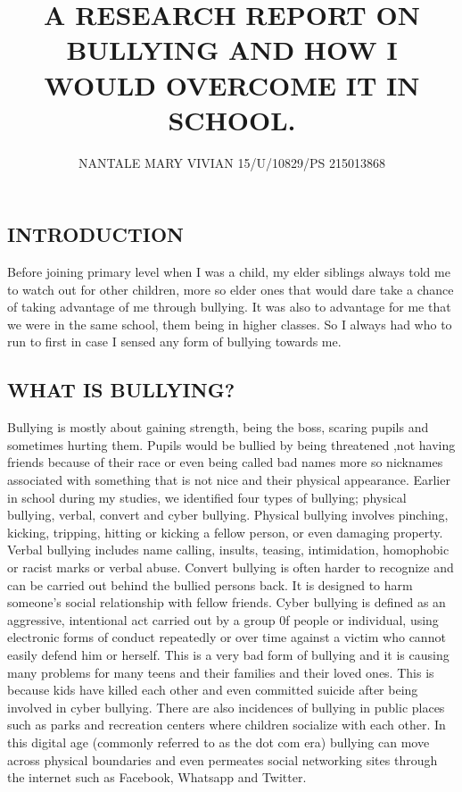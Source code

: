 \documentclass{article}
\begin{document}
\title{A RESEARCH REPORT ON BULLYING AND HOW I WOULD OVERCOME IT IN SCHOOL.}
\author{NANTALE MARY VIVIAN        15/U/10829/PS      215013868 }
\maketitle
\tableofcontents
\subsection{INTRODUCTION }{Before joining primary level when I was a child, my elder siblings always told me to watch out for other children, more so elder ones that would dare take a chance of taking advantage of me through bullying. It was also to advantage for me that we were in the same school, them being in higher classes. So I always had who to run to first in case I sensed any form of bullying towards me.}
\subsection{WHAT IS BULLYING?}{Bullying is mostly about gaining strength, being the boss, scaring pupils and sometimes hurting them. Pupils would be bullied by being threatened ,not having friends because of their race or even  being called bad names more so nicknames associated with something that is not nice and their physical appearance.
Earlier in school during my studies, we identified four types of bullying; physical bullying, verbal, convert and cyber bullying. Physical bullying involves pinching, kicking, tripping, hitting or kicking a fellow person, or even damaging property. Verbal bullying includes name calling, insults, teasing, intimidation, homophobic or racist marks or verbal abuse. Convert bullying is often harder to recognize and can be carried out behind the bullied persons back. It is designed to harm someone’s social relationship with fellow friends. Cyber bullying is defined as an aggressive, intentional act carried out by a group 0f people or individual, using electronic forms of conduct repeatedly or over time against a victim who cannot easily defend him or herself. This is a very bad form of bullying and it is causing many problems for many teens and their families and their loved ones. This is because kids have killed each other and even committed suicide after being involved in cyber bullying. 
There are also incidences of bullying in public places such as parks and recreation centers where children socialize with each other. In this digital age (commonly referred to as the dot com era) bullying can move across physical boundaries and even permeates social networking sites through the internet such as Facebook, Whatsapp and Twitter.
}
\end{document}
